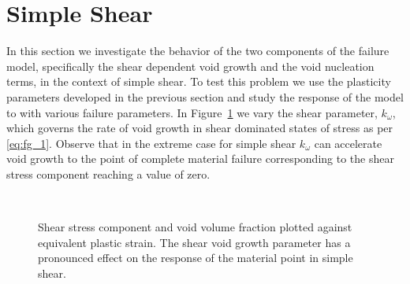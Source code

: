 \section{Simple Shear}
\label{simple-shear}

In this section we investigate the behavior of the two components of
the failure model, specifically the shear dependent void growth and
the void nucleation terms, in the context of simple shear. To test
this problem we use the plasticity parameters developed in the
previous section and study the response of the model to with various
failure parameters. In Figure~\ref{fig:shear-kw} we vary the shear
parameter, $k_{\omega}$, which governs the rate of void growth in
shear dominated states of stress as per \eqref{eq:fg_1}. Observe that
in the extreme case for simple shear $k_{\omega}$ can accelerate void
growth to the point of complete material failure corresponding to the
shear stress component reaching a value of zero.

\begin{figure}[htbp]
  \begin{center}
    ~ 
    \caption{Shear stress component and void volume fraction plotted
      against equivalent plastic strain. The shear void growth
      parameter has a pronounced effect on the response of the
      material point in simple shear.}
    \label{fig:shear-kw}
  \end{center}
\end{figure}

